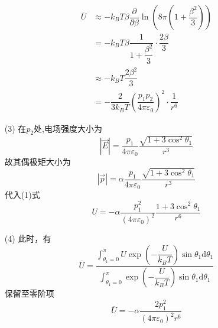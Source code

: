 \documentclass{article}
\begin{document}
\begin{itemize}
    \begin{equation}
        \begin{aligned}
        \overline{U}&\approx-k_B T\beta\dfrac{\partial}{\partial \beta}\ln\left(8\pi(1+\dfrac{\beta^2}{3})\right)\\
            &=-k_B T\beta\dfrac{1}{1+\dfrac{\beta^2}{3}}\cdot\dfrac{2\beta}{3}\\
            &\approx -k_B T\dfrac{2\beta^2}{3}\\
            &=-\dfrac{2}{3k_B T}\left(\dfrac{p_1p_2}{4\pi\varepsilon_0}\right)^2\cdot\dfrac{1}{r^6}
        \end{aligned}
    \end{equation}
    \item[(3)]在$p_2$处,电场强度大小为
    \begin{equation}
        |\overrightarrow{E}|=\dfrac{p_1}{4\pi\varepsilon_0}\dfrac{\sqrt{1+3\cos^2\theta_1}}{r^3}
    \end{equation}
    故其偶极矩大小为
    \begin{equation}
        |\overrightarrow{p}|=\alpha\dfrac{p_1}{4\pi\varepsilon_0}\dfrac{\sqrt{1+3\cos^2\theta_1}}{r^3}
    \end{equation}    
    代入(1)式
    \begin{equation}
        U=-\alpha\dfrac{p_1^2}{(4\pi\varepsilon_0)^2}\dfrac{1+3\cos^2\theta_1}{r^6}
    \end{equation}   
    \item[(4)]此时，有
    \begin{equation}
        \overline{U}=\dfrac{\displaystyle\int_{\theta_1=0}^{\pi}U\exp\left(-\dfrac{U}{k_B T}\right)\sin\theta_1\mathrm{d}\theta_1}{\displaystyle\int_{\theta_1=0}^{\pi}\exp\left(-\dfrac{U}{k_B T}\right)\sin\theta_1\mathrm{d}\theta_1}
    \end{equation}
    保留至零阶项
    \begin{equation}
        \overline{U}=-\alpha\dfrac{2p_1^2}{(4\pi\varepsilon_0)^2r^6}
    \end{equation}
\end{itemize}
\end{document}
